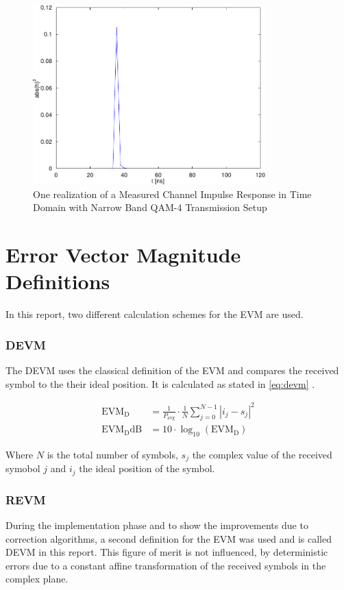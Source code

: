 \begin{figure}[p]
  \centering
  \includegraphics[width=0.8\textwidth]{figures/matlab/res_450_qam4_h}
  \caption{One realization of a Measured Channel Impulse Response in Time Domain
    with Narrow Band \gls{QAM}-4 Transmission Setup}
  \label{fig:res_450_qam4_h}
\end{figure}

\section{Error Vector Magnitude Definitions}
In this report, two different calculation schemes for the \acrfull{EVM}
are used.

\subsubsection{\acrfull{DEVM}}
The \gls{DEVM} uses the classical definition of the \gls{EVM}
and compares the received symbol to the their ideal position.
It is calculated as stated in \eqref{eq:devm} \cite{razavi2011rf}.

\begin{align}
  \text{EVM}_\text{D} &= \frac{1}{P_{\text{avg}}} \cdot \frac{1}{N}
  \sum_{j=0}^{N-1} |i_j - s_j|^2
  \label{eq:devm} \\
  \text{EVM}_\text{D}\text{dB} &= 10 \cdot \log_{10} (\text{EVM}_\text{D})
\end{align}

Where $N$ is the total number of symbols, $s_j$ the complex value of the
received symobol $j$ and $i_j$ the ideal position of the symbol. \\

\subsubsection{\acrfull{REVM}}
During the implementation phase and to show the improvements due to correction
algorithms, a second definition for the \gls{EVM} was used and
is called \gls{DEVM} in this report. This figure of merit is not influenced,
by deterministic errors due to a constant affine transformation of the
received symbols in the complex plane. \\

